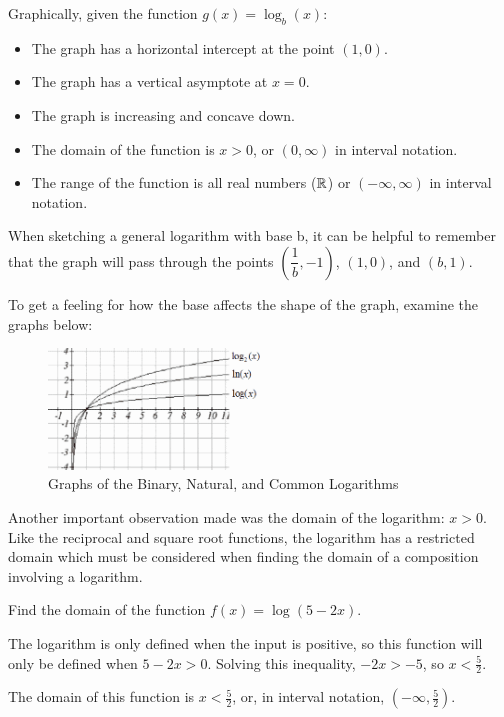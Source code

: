 \begin{theorem}
  Graphically, given the function $g(x)=\log_b(x)$:
  \begin{itemize}
    \item The graph has a horizontal intercept at the point $(1, 0)$.
    \item The graph has a vertical asymptote at $x=0$.
    \item The graph is increasing and concave down.
    \item The domain of the function is $x>0$, or $(0,\infty)$ in interval notation.
    \item The range of the function is all real numbers ($\mathbb{R}$) or $(-\infty,\infty)$ in interval notation.
  \end{itemize}
\end{theorem}
When sketching a general logarithm with base b, it can be helpful to remember that the graph will pass through the points $\left(\dfrac{1}{b}, -1\right)$, $(1,0)$, and $(b,1)$.

To get a feeling for how the base affects the shape of the graph, examine the graphs below:

\begin{figure}[ht!]
\centering
  \includegraphics[width=0.5\textwidth]{img/chap1/sec1-8/image080.png}
\caption{Graphs of the Binary, Natural, and Common Logarithms}
\end{figure}

Another important observation made was the domain of the logarithm: $x>0$. Like the reciprocal and square root functions, the logarithm has a restricted domain which must be considered when finding the domain of a composition involving a logarithm.

\begin{example}
Find the domain of the function $f(x)=\log(5-2x)$.

\begin{solution}  The logarithm is only defined when the input is positive, so this function will only be defined when $5-2x>0$. Solving this inequality, $-2x>-5$, so $x<\frac{5}{2}$.

The domain of this function is $x<\frac{5}{2}$, or, in interval notation, $\left(-\infty,\frac{5}{2}\right)$.
\end{solution}\end{example}
